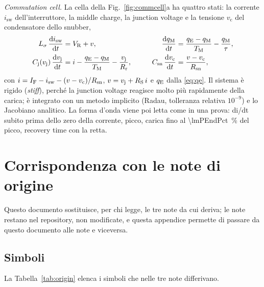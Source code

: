 \documentclass[10pt,a4paper]{scrartcl}
\let\newcommand\pdvaluedefine
\newcommand{\IF}{I_\mathrm{F}}
\newcommand{\VR}{V_\mathrm{R}}
\newcommand{\TM}{T_\mathrm{M}}
\newcommand{\qE}{q_\mathrm{E}}
\newcommand{\qM}{q_\mathrm{M}}
\newcommand{\vj}{v_\mathrm{j}}
\newcommand{\RS}{R_\mathrm{S}}
\newcommand{\Rr}{R_\mathrm{r}}
\newcommand{\Cj}{C_\mathrm{j}}
\newcommand{\Csn}{C_\mathrm{sn}}
\newcommand{\Rsn}{R_\mathrm{sn}}
\newcommand{\diff}{\mathrm{d}}
\newcommand{\Ls}{L_\sigma}                    %
\begin{document}
\emph{Commutation cell.} La cella della Fig.~\ref{fig:commcell}a ha quattro stati: la corrente $i_\mathrm{sw}$ dell'interruttore, la middle charge, la junction voltage e la tensione $v_\mathrm{c}$ del condensatore dello snubber,
\begin{equation}
\begin{aligned}
\Ls\,\frac{\diff i_\mathrm{sw}}{\diff t} &= \VR + v , &\qquad \frac{\diff\qM}{\diff t} &= \frac{\qE-\qM}{\TM} - \frac{\qM}{\tau} , \\
\Cj(\vj)\,\frac{\diff\vj}{\diff t} &= i - \frac{\qE-\qM}{\TM} - \frac{\vj}{\Rr} , &\qquad \Csn\,\frac{\diff v_\mathrm{c}}{\diff t} &= \frac{v - v_\mathrm{c}}{\Rsn} ,
\end{aligned}
\end{equation}
con $i = \IF - i_\mathrm{sw} - (v-v_\mathrm{c})/\Rsn$, $v = \vj + \RS\,i$ e $\qE$ dalla \eqref{eq:qe}. Il sistema è rigido (\emph{stiff}), perché la junction voltage reagisce molto più rapidamente della carica; è integrato con un metodo implicito (Radau, tolleranza relativa $10^{-9}$) e lo Jacobiano analitico. La forma d'onda viene poi letta come in una prova: di/dt subito prima dello zero della corrente, picco, carica fino al \SI{\lmPEndPct}{\percent} del picco, recovery time con la retta.

%
\section{Corrispondenza con le note di origine}
\label{app:origin}
Questo documento sostituisce, per chi legge, le tre note da cui deriva; le note restano nel repository, non modificate, e questa appendice permette di passare da questo documento alle note e viceversa.

\subsection{Simboli}
La Tabella~\ref{tab:origin} elenca i simboli che nelle tre note differivano.
\end{document}
